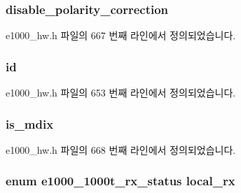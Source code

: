 \subsubsection[{\texorpdfstring{disable\+\_\+polarity\+\_\+correction}{disable_polarity_correction}}]{ disable\+\_\+polarity\+\_\+correction}\hypertarget{structe1000__phy__info_a108c815b940fec6b18966e46aed3892b}{}\label{structe1000__phy__info_a108c815b940fec6b18966e46aed3892b}


e1000\+\_\+hw.\+h 파일의 667 번째 라인에서 정의되었습니다.

\subsubsection[{\texorpdfstring{id}{id}}]{ id}\hypertarget{structe1000__phy__info_a76f8ba65ce8f902c0657233adee58698}{}\label{structe1000__phy__info_a76f8ba65ce8f902c0657233adee58698}


e1000\+\_\+hw.\+h 파일의 653 번째 라인에서 정의되었습니다.

\subsubsection[{\texorpdfstring{is\+\_\+mdix}{is_mdix}}]{ is\+\_\+mdix}\hypertarget{structe1000__phy__info_a89841b638b0d063fac30ed2f712905b0}{}\label{structe1000__phy__info_a89841b638b0d063fac30ed2f712905b0}


e1000\+\_\+hw.\+h 파일의 668 번째 라인에서 정의되었습니다.

\subsubsection[{\texorpdfstring{local\+\_\+rx}{local_rx}}]{\setlength{\rightskip}{0pt plus 5cm}enum {\bf e1000\+\_\+1000t\+\_\+rx\+\_\+status} local\+\_\+rx}\hypertarget{structe1000__phy__info_ad7e8f7fab63d6d04eabcdf2007662073}{}\label{structe1000__phy__info_ad7e8f7fab63d6d04eabcdf2007662073}


